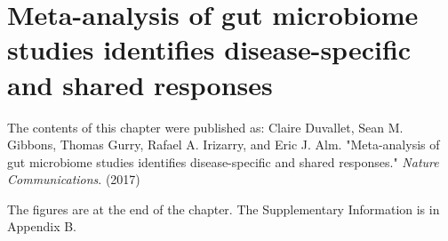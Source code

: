 
\graphicspath{{meta-analysis/figures/}}

\chapter{Meta-analysis of gut microbiome studies identifies disease-specific and shared responses}

The contents of this chapter were published as:
Claire Duvallet, Sean M. Gibbons, Thomas Gurry, Rafael A. Irizarry, and Eric J. Alm. "Meta-analysis of gut microbiome studies identifies disease-specific and shared responses." \textit{Nature Communications}. (2017)

The figures are at the end of the chapter. The Supplementary Information is in Appendix B.


